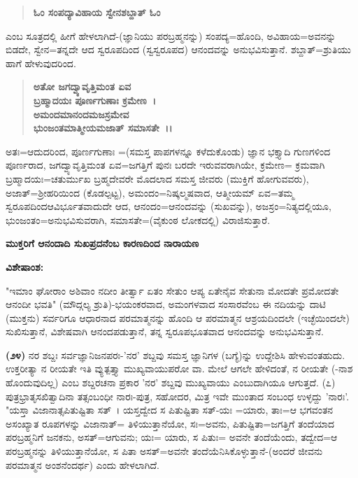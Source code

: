 \begin{verse}
\textbf{ಓಂ ಸಂಪದ್ಯಾವಿಹಾಯ ಸ್ವೇನಶಬ್ದಾತ್ ಓಂ}
\end{verse}


\noindent
ಎಂಬ ಸೂತ್ರದಲ್ಲಿ ಹೀಗೆ ಹೇಳಲಾಗಿದೆ-(ಜ್ಞಾನಿಯು ಪರಬ್ರಹ್ಮನನ್ನು) ಸಂಪದ್ಯ=ಹೊಂದಿ, ಅವಿಹಾಯ=ಅವನನ್ನು ಬಿಡದೇ, ಸ್ವೇನ=ತನ್ನದೇ ಆದ ಸ್ವರೂಪದಿಂದ (ಸ್ವಸ್ವರೂಪದ) ಆನಂದವನ್ನು ಅನುಭವಿಸುತ್ತಾನೆ. ಶಬ್ದಾತ್=ಶ್ರುತಿಯು ಹಾಗೆ ಹೇಳುವುದರಿಂದ.

\begin{verse}
\textbf{ಅತೋ ಜಗದ್ವ್ಯಾವೃತ್ತಿಮಂತ ಏವ}\\\textbf{ಬ್ರಹ್ಮಾದಯಃ ಪೂರ್ಣಗುಣಾಃ ಕ್ರಮೇಣ~।}\\\textbf{ಅಮಂದಮಾನಂದಮಜಸ್ರಮೇವ}\\\textbf{ಭುಂಜಂತಮಾತ್ಮೀಯಮಜಾತ್ ಸಮಾಸತೇ~।।}
\end{verse}

ಅತಃ=ಆದುದರಿಂದ, ಪೂರ್ಣಗುಣಾಃ =(ಸಮಸ್ತ ಪಾಪಗಳನ್ನೂ ಕಳೆದುಕೊಂಡು) ಜ್ಞಾನ ಭಕ್ತ್ಯಾದಿ ಗುಣಗಳಿಂದ ಪೂರ್ಣರಾದ, ಜಗದ್ವ್ಯಾವೃತ್ತಿಮಂತ ಏವ=ಜಗತ್ತಿಗೆ ಪುನಃ ಬರದೇ ಇರುವವರಾಗಿಯೇ, ಕ್ರಮೇಣ= ಕ್ರಮವಾಗಿ ಬ್ರಹ್ಮಾದಯಃ=ಚತುರ್ಮುಖ ಬ್ರಹ್ಮದೇವರೇ ಮೊದಲಾದ ಸಮಸ್ತ ಜೀವರು (ಮುಕ್ತಿಗೆ ಹೋಗುವವರು), ಅಜಾತ್=ಶ‍್ರೀಹರಿಯಿಂದ (ಕೊಡಲ್ಪಟ್ಟ), ಅಮಂದಂ=ನಿಷ್ಕಲ್ಮಷವಾದ, ಆತ್ಮೀಯಮ್ ಏವ=ತಮ್ಮ ಸ್ವರೂಪದಿಂದ\break ಆವಿರ್ಭೂತವಾದುದೇ ಆದ, ಆನಂದಂ=ಆನಂದವನ್ನು (ಸುಖವನ್ನು), ಅಜಸ್ರಂ=ನಿತ್ಯ\-ದಲ್ಲಿಯೂ, ಭುಂಜಂತಂ=ಅನುಭವಿಸುವರಾಗಿ, ಸಮಾಸತೇ=(ವೈಕುಂಠ ಲೋಕದಲ್ಲಿ) ವಿರಾಜಿ\-ಸುತ್ತಾರೆ.

\begin{center}
\textbf{ಮುಕ್ತರಿಗೆ ಆನಂದಾದಿ ಸುಖಪ್ರದನೆಂಬ ಕಾರಣದಿಂದ ನಾರಾಯಣ}
\end{center}

\noindent
\textbf{ವಿಶೇಷಾಂಶ:\enginline{-}}

"ಇಮಾಂ ಘೋರಾಂ ಅಶಿವಾಂ ನದೀಂ ತೀರ್ತ್ವಾ ಏತಂ ಸೇತುಂ ಆಪ್ಯ ಏತೇನೈವ ಸೇತುನಾ ಮೋದತೇ ಪ್ರಮೋದತೇ ಆನಂದೀ ಭವತಿ" (ಮೌದ್ಗಲ್ಯ ಶ್ರುತಿ)-ಭಯಂಕರವಾದ, ಅಮಂಗಳವಾದ ಸಂಸಾರವೆಂಬ ಈ ನದಿಯನ್ನು ದಾಟಿ (ಮುಕ್ತನು) ಸರ್ವರಿಗೂ ಆಧಾರನಾದ ಪರಮಾತ್ಮನನ್ನು ಹೊಂದಿ ಆ ಪರಮಾತ್ಮನ ಆಶ್ರಯದಿಂದಲೇ (ಇಚ್ಛೆಯಿಂದಲೇ) ಸುಖಿಸುತ್ತಾನೆ, ವಿಶೇಷವಾಗಿ ಆನಂದಪಡುತ್ತಾನೆ, ತನ್ನ ಸ್ವರೂಪಭೂತವಾದ ಆನಂದವನ್ನು ಅನುಭವಿಸುತ್ತಾನೆ.

\textbf{(೨೪)} ನರ ಶಬ್ದಃ ಸರ್ವಜ್ಞಾನಿಜನಪರಃ-'ನರ' ಶಬ್ದವು ಸಮಸ್ತ ಜ್ಞಾನಿಗಳ (ಬಗ್ಯೆ)ನ್ನು ಉದ್ದೇಶಿಸಿ ಹೇಳುವಂತಹುದು. ಉಕ್ತರೀತ್ಯಾ ನ ರೀಯತೇ ಇತಿ ವ್ಯುತ್ಪತ್ತ್ಯಾ ಮುಖ್ಯವಾಯುಪರೋ ವಾ. ಮೇಲೆ ಆಗಲೇ ಹೇಳಿದಂತೆ, ನ ರೀಯತೇ (-ನಾಶ ಹೊಂದುವುದಿಲ್ಲ) ಎಂಬ ಶಬ್ದರಚನಾ ಪ್ರಕಾರ 'ನರ' ಶಬ್ದವು ಮುಖ್ಯವಾಯು ಎಂಬುದಾಗಿಯೂ ಆಗುತ್ತದೆ. (೭) ಪುತ್ರಭ್ರಾತೃಸಖಿತ್ವಾದಿನಾ ತತ್ಸಂಬಂಧೀ ನಾರಃ-ಪುತ್ರ, ಸಹೋದರ, ಮಿತ್ರ ಇವೇ ಮುಂತಾದ ಸಂಬಂಧ ಉಳ್ಳದ್ದು 'ನಾರಃ'. "ಯಸ್ತಾ ವಿಜಾನಾತ್ಸಪಿತುಷ್ಟಿತಾ ಸತ್~। ಯಸ್ತದ್ವೇದ ಸ ಪಿತುಷ್ಟಿತಾ ಸತ್-ಯಃ =ಯಾರು, ತಾಃ=ಆ ಭಗವಂತನ ಅಸಂಖ್ಯಾತ ರೂಪಗಳನ್ನು ವಿಜಾನಾತ್= ತಿಳಿಯುತ್ತಾನೆಯೋ, ಸಃ=ಅವನು, ಪಿತುಷ್ಟಿತಾ=ಜಗತ್ತಿಗೆ ತಂದೆಯಾದ ಪರಬ್ರಹ್ಮನಿಗೆ ಜನಕನು, ಅಸತ್=ಆಗುವನು; ಯಃ= ಯಾರು, ಸ ಪಿತುಃ= ಅವನೇ ತಂದೆಯೆಂದು, ತದ್ವೇದ=ಆ ಪರಬ್ರಹ್ಮನನ್ನು ತಿಳಿಯುತ್ತಾನೆಯೋ, ಸ ಪಿತಾ ಅಸತ್=ಅವನೇ ತಂದೆಯೆನಿಸಿ\-ಕೊಳ್ಳುತ್ತಾನೆ-(ಅಂದರೆ ಜೀವನು ಪರಮಾತ್ಮನ ಅಂಶನೆಂದರ್ಥ) ಎಂದು ಹೇಳಲಾಗಿದೆ.

